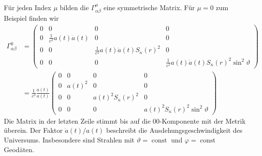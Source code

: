 Für jeden Index $\mu$ bilden die $\Gamma^\mu_{\alpha\beta}$
eine symmetrische Matrix.
Für $\mu=0$ zum Beispiel finden wir
\begin{align*}
\Gamma^0_{\alpha\beta}
&=
\begin{pmatrix}
0&0&0&0\\
0&\frac1{c^2} a(t)\dot a(t)& 0 & 0 \\
0 & 0 & \frac1{c^2}a(t)\dot a(t)S_\kappa(r)^2 & 0 \\
0 & 0 & 0 & \frac1{c^2} a(t)\dot a(t)S_\kappa(r)^2 \sin^2\vartheta
\end{pmatrix}
\\
&=
\frac1{c^2}
\frac{\dot a(t)}{a(t)}
\begin{pmatrix}
0&     0&                  0&                                 0\\
0&a(t)^2&                  0&                                 0\\
0&     0&a(t)^2S_\kappa(r)^2&                                 0\\
0&     0&                  0&a(t)^2S_\kappa(r)^2\sin^2\vartheta
\end{pmatrix}
\end{align*}
Die Matrix in der letzten Zeile stimmt bis auf die $00$-Komponente
mit der Metrik überein.
Der Faktor $\dot a(t)/a(t)$ beschreibt die Ausdehungsgeschwindigkeit
des Universums.
Insbesondere sind Strahlen mit
$\vartheta=\operatorname{const}$
und
$\varphi=\operatorname{const}$
Geodäten.


